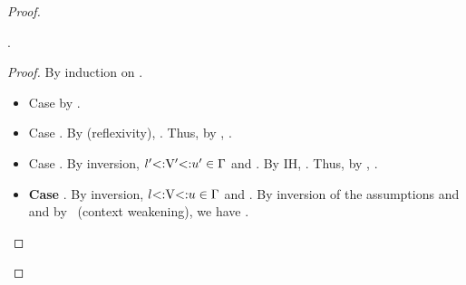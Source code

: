 \begin{proof}
\begin{itemize}
            \begin{lemma}\label{lem:sub-var-right-sub-ub}
                .
            \end{lemma}
            \begin{proof}
                By induction on .
                \begin{itemize}
                    \item Case  by .
                    \item Case  \subtydflt{\vany}{\vany}.
                        By  (reflexivity),
                        \subtydflt{\tyub}{\tyub}.
                        Thus, by , \subtydflt{\vany}{\tyub}.
                    \item Case  
                        .
                        By inversion, $l'{\operatorname{<:}}\mathrm{V}'{\operatorname{<:}}u' \in \Gamma$
                        and .
                        By IH,
                        .
                        Thus, by ,
                        .
                    \item \textbf{Case } .
                        By inversion, $l{\operatorname{<:}}\mathrm{V}{\operatorname{<:}}u \in \Gamma$
                        and .
                        By inversion of the assumptions \tyvlddflt{\vany} and
                        \tyvld{\,}{\AEnv} and by~
                        (context weakening), we have \subtydflt{\tylb}{\tyub}.


\end{itemize}
\end{proof}
\end{itemize}
\end{proof}
